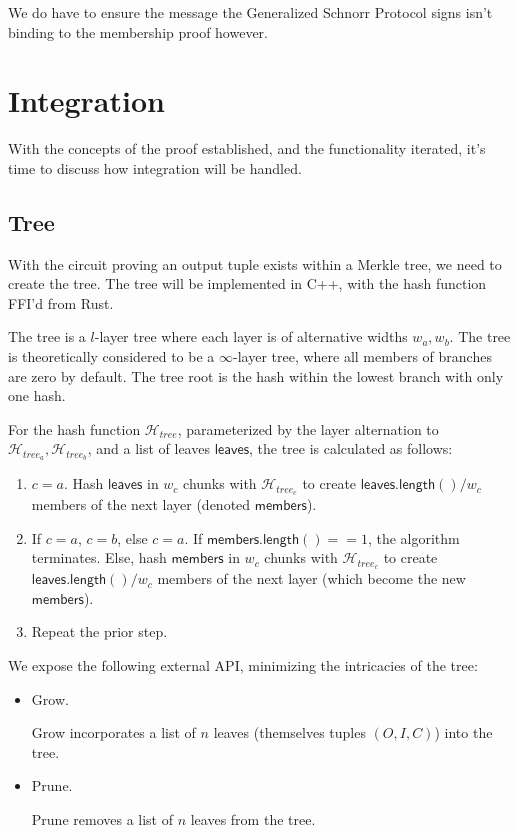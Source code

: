\documentclass[]{article}
\begin{document}
We do have to ensure the message the Generalized Schnorr Protocol signs isn't binding to the membership proof however.

\newpage

\section{Integration}

With the concepts of the proof established, and the functionality iterated, it's time to discuss how integration will be handled.

\subsection{Tree}

With the circuit proving an output tuple exists within a Merkle tree, we need to create the tree. The tree will be implemented in C++, with the hash function FFI'd from Rust.

The tree is a $l$-layer tree where each layer is of alternative widths $w_a, w_b$. The tree is theoretically considered to be a $\infty$-layer tree, where all members of branches are zero by default. The tree root is the hash within the lowest branch with only one hash.

For the hash function $\mathcal{H}_{tree}$, parameterized by the layer alternation to $\mathcal{H}_{tree_a}, \mathcal{H}_{tree_b}$, and a list of leaves $\mathsf{leaves}$, the tree is calculated as follows:

\begin{enumerate}
	\item $c = a$. Hash $\mathsf{leaves}$ in $w_c$ chunks with $\mathcal{H}_{tree_c}$ to create $\mathsf{leaves.length()} / w_c$ members of the next layer (denoted $\mathsf{members}$).
	\item If $c = a$, $c = b$, else $c = a$. If $\mathsf{members.length()} == 1$, the algorithm terminates. Else, hash $\mathsf{members}$ in $w_c$ chunks with $\mathcal{H}_{tree_c}$ to create $\mathsf{leaves.length()} / w_c$ members of the next layer (which become the new $\mathsf{members}$).
	\item Repeat the prior step.
\end{enumerate}

We expose the following external API, minimizing the intricacies of the tree:

\begin{itemize}
  \item Grow.
  
  Grow incorporates a list of $n$ leaves (themselves tuples $(O, I, C)$) into the tree.
  \item Prune.

  Prune removes a list of $n$ leaves from the tree.
\end{itemize}
\end{document}
